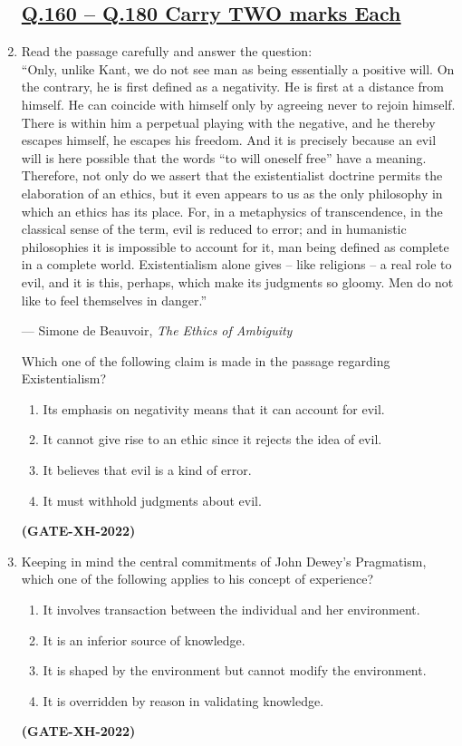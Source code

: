 \documentclass[journal]{IEEEtran}
\begin{document}
\begin{enumerate}
\subsection*{\underline{\textbf{Q.160 – Q.180 Carry TWO marks Each}}}

\item Read the passage carefully and answer the question:\\
“Only, unlike Kant, we do not see man as being essentially a positive will. On the contrary, he is first defined as a negativity. He is first at a distance from himself. He can coincide with himself only by agreeing never to rejoin himself. There is within him a perpetual playing with the negative, and he thereby escapes himself, he escapes his freedom. And it is precisely because an evil will is here possible that the words “to will oneself free” have a meaning. Therefore, not only do we assert that the existentialist doctrine permits the elaboration of an ethics, but it even appears to us as the only philosophy in which an ethics has its place. For, in a metaphysics of transcendence, in the classical sense of the term, evil is reduced to error; and in humanistic philosophies it is impossible to account for it, man being defined as complete in a complete world. Existentialism alone gives – like religions – a real role to evil, and it is this, perhaps, which make its judgments so gloomy. Men do not like to feel themselves in danger.”

\hfill --- Simone de Beauvoir, \textit{The Ethics of Ambiguity}

Which one of the following claim is made in the passage regarding Existentialism?
\begin{enumerate}
\item Its emphasis on negativity means that it can account for evil.  
\item It cannot give rise to an ethic since it rejects the idea of evil.  
\item It believes that evil is a kind of error.  
\item It must withhold judgments about evil.  
\end{enumerate}
\hfill\textbf{(GATE-XH-2022)}

\item Keeping in mind the central commitments of John Dewey’s Pragmatism, which one of the following applies to his concept of experience?
\begin{enumerate}
\item It involves transaction between the individual and her environment.  
\item It is an inferior source of knowledge.  
\item It is shaped by the environment but cannot modify the environment.  
\item It is overridden by reason in validating knowledge.  
\end{enumerate}
\hfill\textbf{(GATE-XH-2022)}


\end{enumerate}
\end{document}
